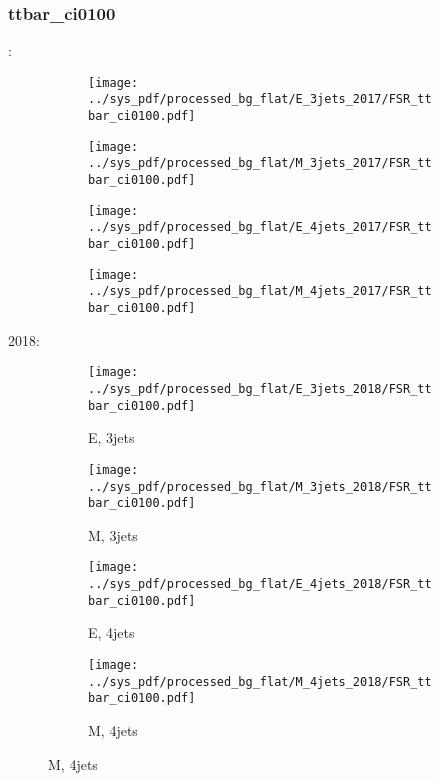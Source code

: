 \documentclass{beamer}
\begin{document}
\begin{frame}
\frametitle{ttbar_ci0100}
\fontsize{5}{1}:
\begin{figure}
\centering
\begin{subfigure}[b]{0.24\textwidth}
\texttt{[image: ../sys\_pdf/processed\_bg\_flat/E\_3jets\_2017/FSR\_ttbar\_ci0100.pdf]}
\end{subfigure}
\begin{subfigure}[b]{0.24\textwidth}
\texttt{[image: ../sys\_pdf/processed\_bg\_flat/M\_3jets\_2017/FSR\_ttbar\_ci0100.pdf]}
\end{subfigure}
\begin{subfigure}[b]{0.24\textwidth}
\texttt{[image: ../sys\_pdf/processed\_bg\_flat/E\_4jets\_2017/FSR\_ttbar\_ci0100.pdf]}
\end{subfigure}
\begin{subfigure}[b]{0.24\textwidth}
\texttt{[image: ../sys\_pdf/processed\_bg\_flat/M\_4jets\_2017/FSR\_ttbar\_ci0100.pdf]}
\end{subfigure}
\end{figure}
2018:
\begin{figure}
\centering
\begin{subfigure}[b]{0.24\textwidth}
\texttt{[image: ../sys\_pdf/processed\_bg\_flat/E\_3jets\_2018/FSR\_ttbar\_ci0100.pdf]}
\captionsetup{font=tiny}
\caption{E, 3jets}
\end{subfigure}
\begin{subfigure}[b]{0.24\textwidth}
\texttt{[image: ../sys\_pdf/processed\_bg\_flat/M\_3jets\_2018/FSR\_ttbar\_ci0100.pdf]}
\captionsetup{font=tiny}
\caption{M, 3jets}
\end{subfigure}
\begin{subfigure}[b]{0.24\textwidth}
\texttt{[image: ../sys\_pdf/processed\_bg\_flat/E\_4jets\_2018/FSR\_ttbar\_ci0100.pdf]}
\captionsetup{font=tiny}
\caption{E, 4jets}
\end{subfigure}
\begin{subfigure}[b]{0.24\textwidth}
\texttt{[image: ../sys\_pdf/processed\_bg\_flat/M\_4jets\_2018/FSR\_ttbar\_ci0100.pdf]}
\captionsetup{font=tiny}
\caption{M, 4jets}
\end{subfigure}
\end{figure}
\end{frame}
\end{document}
